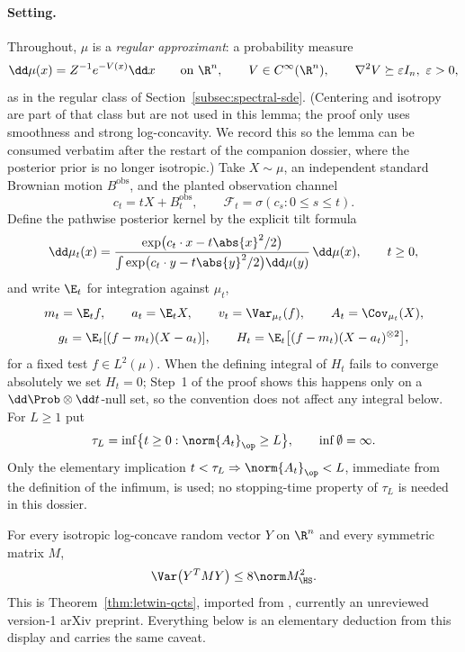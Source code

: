 \documentclass[../main.tex]{subfiles}
\begin{document}
\paragraph{Setting.}
Throughout, $\mu$ is a \emph{regular approximant}: a probability measure
\[
  \dd\mu(x)=Z^{-1}e^{-V(x)}\dd x
  \qquad\text{on }\R^n,
  \qquad V\in C^\infty(\R^n),\qquad \nabla^2V\succeq\varepsilon I_n,\ \varepsilon>0,
\]
as in the regular class of Section~\ref{subsec:spectral-sde}.  (Centering and isotropy
are part of that class but are not used in this lemma; the proof only uses smoothness and
strong log-concavity.  We record this so the lemma can be consumed verbatim after the
restart of the companion dossier, where the posterior prior is no longer isotropic.)
Take $X\sim\mu$, an independent standard Brownian motion $B^{\mathrm{obs}}$, and the
planted observation channel
\[
  c_t=tX+B_t^{\mathrm{obs}},
  \qquad
  \mathcal F_t=\sigma(c_s:0\le s\le t).
\]
Define the pathwise posterior kernel by the explicit tilt formula
\begin{equation}
  \dd\mu_t(x)
  =\frac{\exp\bigl(c_t\cdot x-t\abs{x}^2/2\bigr)}
        {\int\exp\bigl(c_t\cdot y-t\abs{y}^2/2\bigr)\dd\mu(y)}\,\dd\mu(x),
  \qquad t\ge0,
  \label{eq:sol-sws-posterior}
\end{equation}
and write $\E_t$ for integration against $\mu_t$,
\[
  m_t=\E_tf,\qquad a_t=\E_tX,\qquad v_t=\Var_{\mu_t}(f),\qquad
  A_t=\Cov_{\mu_t}(X),
\]
\[
  g_t=\E_t[(f-m_t)(X-a_t)],
  \qquad
  H_t=\E_t\bigl[(f-m_t)(X-a_t)^{\otimes2}\bigr],
\]
for a fixed test $f\in L^2(\mu)$.  When the defining integral of $H_t$ fails to converge
absolutely we set $H_t=0$; Step~1 of the proof shows this happens only on a
$\dd\Prob\otimes\dd t$-null set, so the convention does not affect any integral below.
For $L\ge1$ put
\[
  \tau_L=\inf\bigl\{t\ge0:\norm{A_t}_\op\ge L\bigr\},
  \qquad \inf\emptyset=\infty .
\]
Only the elementary implication $t<\tau_L\Rightarrow\norm{A_t}_\op<L$, immediate from
the definition of the infimum, is used; no stopping-time property of $\tau_L$ is needed
in this dossier.

\begin{hypothesis}
\label{hyp:sol-sws-letwin}
For every isotropic log-concave random vector $Y$ on $\R^n$ and every symmetric matrix
$M$,
\[
  \Var\bigl(Y^TMY\bigr)\le8\norm M_{\HS}^2 .
\]
This is Theorem~\ref{thm:letwin-qcts}, imported from
\cite[Thm.~1.2]{Letwin2026QuadraticKLS}, currently an unreviewed version-1 arXiv
preprint.  Everything below is an elementary deduction from this display and carries the
same caveat.
\end{hypothesis}
\end{document}
